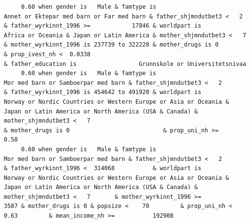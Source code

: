 \documentclass[
  letterpaper,
  DIV=11,
  numbers=noendperiod]{scrreprt}
\begin{document}
\begin{verbatim}
     0.60 when gender is   Male & famtype is                        Annet or Ektepar med barn or Far med barn & father_shjmndutbet3 <   2       & father_wyrkinnt_1996 >=            17846 & worldpart is                                                                                          Africa or Oceania & Japan or Latin America & mother_shjmndutbet3 <   7       & mother_wyrkinnt_1996 is 237739 to 322228 & mother_drugs is 0                                                                                                                                                              & prop_ivest_nh <  0.0338                                                                                                                                                        & father_education is                  Grunnskole or Universitetsnivaa                    
     0.60 when gender is   Male & famtype is                              Mor med barn or Samboerpar med barn & father_shjmndutbet3 <   2       & father_wyrkinnt_1996 is 454642 to 491920 & worldpart is            Norway or Nordic Countries or Western Europe or Asia or Oceania & Japan or Latin America or North America (USA & Canada) & mother_shjmndutbet3 <   7                                                  & mother_drugs is 0                           & prop_uni_nh >=         0.58                                                                                                                                                                                                                                                                                                                                                                                 
     0.60 when gender is   Male & famtype is                              Mor med barn or Samboerpar med barn & father_shjmndutbet3 <   2       & father_wyrkinnt_1996 <  314068           & worldpart is            Norway or Nordic Countries or Western Europe or Asia or Oceania & Japan or Latin America or North America (USA & Canada) & mother_shjmndutbet3 <   7       & mother_wyrkinnt_1996 >=             3587 & mother_drugs is 0 & popsize <    70         & prop_uni_nh <  0.63         & mean_income_nh >=           192908                                                                                                                                                                                                                                                                                                                                            

\end{verbatim}
\end{document}
